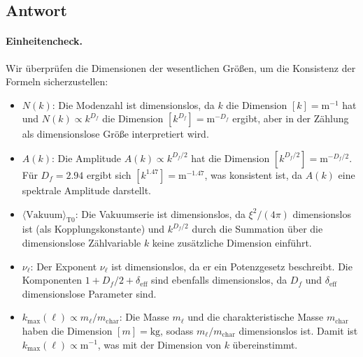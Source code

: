 \documentclass[12pt,a4paper]{article}
\theoremstyle{remark}
\newenvironment{answer}{\subsection*{Antwort}}{\vspace{1em}}
\begin{document}
\begin{answer}
	\paragraph{Einheitencheck.}
	Wir überprüfen die Dimensionen der wesentlichen Größen, um die Konsistenz der Formeln sicherzustellen:
	\begin{itemize}
		\item \( N(k) \): Die Modenzahl ist dimensionslos, da \( k \) die Dimension \([k] = \text{m}^{-1}\) hat und \( N(k) \propto k^{D_f} \) die Dimension \([k^{D_f}] = \text{m}^{-D_f}\) ergibt, aber in der Zählung als dimensionslose Größe interpretiert wird.
		\item \( A(k) \): Die Amplitude \( A(k) \propto k^{D_f / 2} \) hat die Dimension \([k^{D_f / 2}] = \text{m}^{-D_f / 2}\). Für \( D_f = 2.94 \) ergibt sich \([k^{1.47}] = \text{m}^{-1.47}\), was konsistent ist, da \( A(k) \) eine spektrale Amplitude darstellt.
		\item \( \langle \mathrm{Vakuum} \rangle_{\text{T0}} \): Die Vakuumserie ist dimensionslos, da \( \xi^2 / (4\pi) \) dimensionslos ist (als Kopplungskonstante) und \( k^{D_f / 2} \) durch die Summation über die dimensionslose Zählvariable \( k \) keine zusätzliche Dimension einführt.
		\item \( \nu_\ell \): Der Exponent \( \nu_\ell \) ist dimensionslos, da er ein Potenzgesetz beschreibt. Die Komponenten \( 1 + D_f / 2 + \delta_{\text{eff}} \) sind ebenfalls dimensionslos, da \( D_f \) und \( \delta_{\text{eff}} \) dimensionslose Parameter sind.
		\item \( k_{\max}(\ell) \propto m_\ell / m_{\text{char}} \): Die Masse \( m_\ell \) und die charakteristische Masse \( m_{\text{char}} \) haben die Dimension \([m] = \text{kg}\), sodass \( m_\ell / m_{\text{char}} \) dimensionslos ist. Damit ist \( k_{\max}(\ell) \propto \text{m}^{-1} \), was mit der Dimension von \( k \) übereinstimmt.
	\end{itemize}
	

\end{answer}
\end{document}
